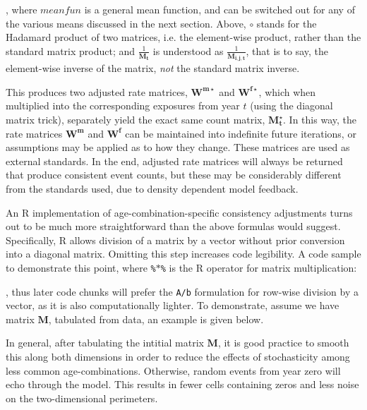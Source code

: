 \noindent, where $meanfun$ is a general mean function, and can be switched out for any of the various means discussed in the next section. Above, $\circ$ stands for the Hadamard product of two matrices, i.e. the element-wise product, rather than the standard matrix product; and $\frac{1}{\bm{M_{t}}}$ is understood as $\frac{1}{\bm{M_{i,j,t}}}$, that is to say, the element-wise inverse of the matrix, \textit{not} the standard matrix inverse.

This produces two adjusted rate matrices, $\bm{W^{m\star}}$ and $\bm{W^{f\star}}$, which when multiplied into the corresponding exposures from year $t$ (using the diagonal matrix trick), separately yield the exact same count matrix, $\bm{M_{t}^{\star}}$. In this way, the rate matrices $\bm{W^m}$ and $\bm{W^f}$ can be maintained into indefinite future iterations, or assumptions may be applied as to how they change. These matrices are used as external standards. In the end, adjusted rate matrices will always be returned that produce consistent event counts, but these may be considerably different from the standards used, due to density dependent model feedback.

An R implementation of age-combination-specific consistency adjustments turns out to be much more straightforward than the above formulas would suggest. Specifically, R allows division of a matrix by a vector without prior conversion into a diagonal matrix. Omitting this step increases code legibility. A code sample to demonstrate this point, where \texttt{\%$\ast$\%} is the R operator for matrix multiplication:



\noindent, thus later code chunks will prefer the \texttt{A/b} formulation for row-wise division by a vector, as it is also computationally lighter. To demonstrate, assume we have matrix $\bm{M}$, tabulated from data, an example is given below.

In general, after tabulating the intitial matrix $\bm{M}$, it is good practice to smooth this along both dimensions in order to reduce the effects of stochasticity among less common age-combinations. Otherwise, random events from year zero will echo through the model. This results in fewer cells containing zeros and less noise on the two-dimensional perimeters. 

